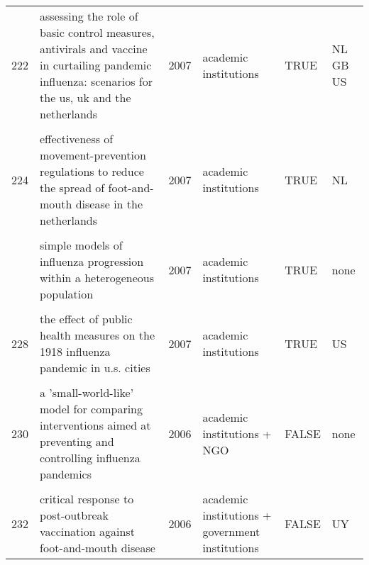 \documentclass[
]{article}
\begin{document}
\begin{landscape}
\begin{longtable}{l>{\raggedright\arraybackslash}p{4cm}l>{\raggedright\arraybackslash}p{3.5cm}l>{\raggedright\arraybackslash}p{1.5cm}}
222 & assessing the role of basic control measures, antivirals and vaccine in curtailing pandemic influenza: scenarios for the us, uk and the netherlands & 2007 & academic institutions & TRUE & NL GB US\\
\cellcolor{gray!6}{223} & \cellcolor{gray!6}{deterministic sir (susceptible–infected–removed) models applied to varicella outbreaks} & \cellcolor{gray!6}{2007} & \cellcolor{gray!6}{academic institutions} & \cellcolor{gray!6}{TRUE} & \cellcolor{gray!6}{CO}\\
224 & effectiveness of movement-prevention regulations to reduce the spread of foot-and-mouth disease in the netherlands & 2007 & academic institutions & TRUE & NL\\
\cellcolor{gray!6}{225} & \cellcolor{gray!6}{effects of internal border control on spread of pandemic influenza} & \cellcolor{gray!6}{2007} & \cellcolor{gray!6}{academic institutions + government institutions} & \cellcolor{gray!6}{FALSE} & \cellcolor{gray!6}{AU}\\
\addlinespace
226 & simple models of influenza progression within a heterogeneous population & 2007 & academic institutions & TRUE & none\\
\cellcolor{gray!6}{227} & \cellcolor{gray!6}{stochastic model of an influenza epidemic with drug resistance} & \cellcolor{gray!6}{2007} & \cellcolor{gray!6}{academic institutions + government institutions} & \cellcolor{gray!6}{FALSE} & \cellcolor{gray!6}{none}\\
228 & the effect of public health measures on the 1918 influenza pandemic in u.s. cities & 2007 & academic institutions & TRUE & US\\
\cellcolor{gray!6}{229} & \cellcolor{gray!6}{vaccinating in disease-free regions: a vaccine model with application to yellow fever} & \cellcolor{gray!6}{2007} & \cellcolor{gray!6}{academic institutions + government institutions} & \cellcolor{gray!6}{FALSE} & \cellcolor{gray!6}{BR}\\
230 & a 'small-world-like' model for comparing interventions aimed at preventing and controlling influenza pandemics & 2006 & academic institutions + NGO & FALSE & none\\
\addlinespace
\cellcolor{gray!6}{231} & \cellcolor{gray!6}{containing pandemic influenza with antiviral agents: analytical commentary} & \cellcolor{gray!6}{2006} & \cellcolor{gray!6}{academic institutions} & \cellcolor{gray!6}{TRUE} & \cellcolor{gray!6}{US}\\
232 & critical response to post-outbreak vaccination against foot-and-mouth disease & 2006 & academic institutions + government institutions & FALSE & UY\\

\end{longtable}
\end{landscape}
\end{document}
